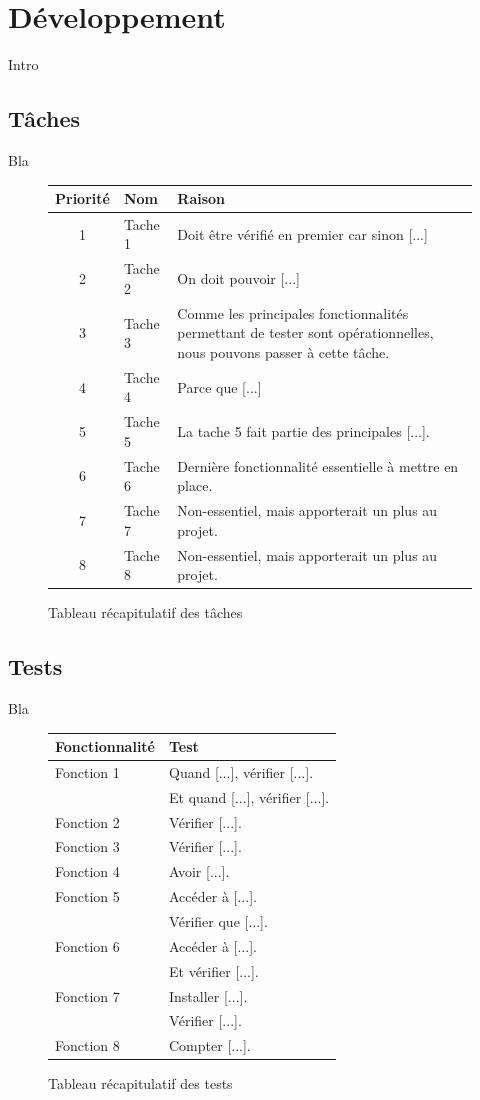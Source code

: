\newpage

\section{Développement}

Intro

\subsection{Tâches}

Bla\\


\begin{figure}[!h]
\begin{center}
\begin{tabularx}{17cm}{|c|p{6cm}|X|}
  \hline
  Priorité & Nom & Raison\\
  \hline
  1 & Tache 1 & Doit être vérifié en premier car sinon [...] \tabularnewline
  2 & Tache 2 & On doit pouvoir [...] \tabularnewline
  3 & Tache 3 & Comme les principales fonctionnalités permettant de tester sont opérationnelles, nous pouvons passer à cette tâche. \tabularnewline
  4 & Tache 4 & Parce que [...] \tabularnewline
  5 & Tache 5 & La tache 5 fait partie des principales [...]. \tabularnewline
  6 & Tache 6 & Dernière fonctionnalité essentielle à mettre en place. \tabularnewline
  7 & Tache 7 & Non-essentiel, mais apporterait un plus au projet. \tabularnewline
  8 & Tache 8 & Non-essentiel, mais apporterait un plus au projet. \tabularnewline
  \hline
\end{tabularx}
\end{center}
\caption{Tableau récapitulatif des tâches}
\end{figure}

\subsection{Tests}

Bla\\

\begin{figure}[!h]
\begin{center}
\begin{tabularx}{17cm}{|p{6cm}|X|}
  \hline
  Fonctionnalité & Test\\
  \hline
  Fonction 1 & Quand [...], vérifier [...]. \tabularnewline
  & Et quand [...], vérifier [...]. \tabularnewline
  Fonction 2 & Vérifier [...]. \tabularnewline
  Fonction 3 & Vérifier [...]. \tabularnewline
  Fonction 4 & Avoir [...]. \tabularnewline
  Fonction 5 & Accéder à [...]. \tabularnewline
   & Vérifier que [...]. \tabularnewline
  Fonction 6 & Accéder à [...]. \tabularnewline
   & Et vérifier [...]. \tabularnewline
  Fonction 7 & Installer [...]. \tabularnewline
   & Vérifier [...]. \tabularnewline
  Fonction 8 & Compter [...]. \tabularnewline
  \hline
\end{tabularx}
\end{center}
\caption{Tableau récapitulatif des tests}
\end{figure}
\fi